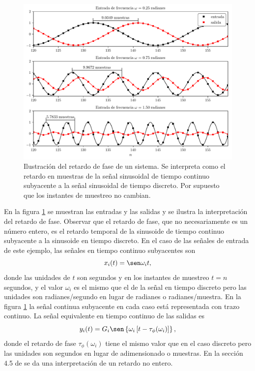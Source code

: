 \documentclass[a4paper]{report}
\begin{document}
\begin{figure}[!htb]
 \begin{center}
 \includegraphics[width=\textwidth]{figuras/seq_and_sys_frequency_response_output_response_phase.pdf}
 \caption{\label{fig:seq_and_sys_frequency_response_output_response_phase} Ilustración del retardo de fase de un sistema. Se interpreta como el retardo en muestras de la señal sinusoidal de tiempo continuo subyacente a la señal sinusoidal de tiempo discreto. Por supuesto que los instantes de muestreo no cambian.}
 \end{center}
\end{figure}
En la figura \ref{fig:seq_and_sys_frequency_response_output_response_phase} se muestran las entradas y las salidas y se ilustra la interpretación del retardo de fase. Observar que el retardo de fase, que no necesariamente es un número entero, es el retardo temporal de la sinusoide de tiempo continuo subyacente a la sinusoide en tiempo discreto. En el caso de las señales de entrada de este ejemplo, las señales en tiempo continuo subyacentes son
\[
 x_i(t)=\sen\omega_it,
\]
donde las unidades de \(t\) son segundos y en los instantes de muestreo \(t=n\) segundos, y el valor \(\omega_i\) es el mismo que el de la señal en tiempo discreto pero las unidades son radianes/segundo en lugar de radianes o radianes/muestra. En la figura \ref{fig:seq_and_sys_frequency_response_output_response_phase} la señal continua subyacente en cada caso está representada con trazo continuo. La señal equivalente en tiempo continuo de las salidas es
\[
 y_i(t)=G_i\sen\left\{\omega_i\left[t-\tau_\phi(\omega_i)\right]\right\},
\]
donde el retardo de fase \(\tau_\phi(\omega_i)\) tiene el mismo valor que en el caso discreto pero las unidades son segundos en lugar de adimensionado o muestras. En la sección 4.5 de \cite{oppenheim2009discrete} se da una interpretación de un retardo no entero. 
\end{document}
